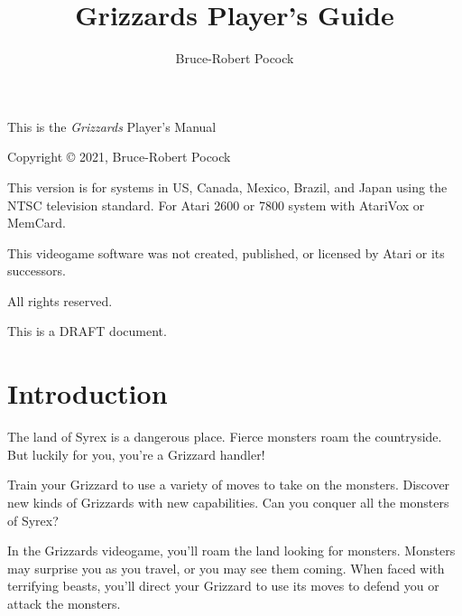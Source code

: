 \documentclass[12pt,twoside]{memoir}
\title{Grizzards Player's Guide}
\author{Bruce-Robert Pocock}
\makeatletter
\newcommand\TV{NTSC}
\newcommand\REGION{US, Canada, Mexico, Brazil, and Japan}
\newcommand\TV{PAL}
\newcommand\REGION{UK and Europe (except France)}
\newcommand\TV{SECAM}
\newcommand\REGION{France, Russia, Africa}
\def\maketitle{%
  \null
  \thispagestyle{empty}%
  \vfill
  \begin{center}\leavevmode
    \normalfont
    {\LARGE\raggedleft \@author\par}%
    \hrulefill\par
    {\huge\raggedright \@title\par}%
    \vskip 1cm
  \end{center}%
  \vfill
  \null
  \cleardoublepage
  }
\makeatother
\begin{document}


\maketitle

\frontmatter

\null\vfill

\begin{flushleft}
This is the \textit{Grizzards} Player's Manual

Copyright \copyright{} 2021, Bruce-Robert Pocock

\bigskip

This version is for systems in \REGION{} using the \TV{} television
standard. For Atari 2600 or 7800 system with AtariVox or MemCard.

\bigskip

This videogame software was not created, published, or licensed by Atari
or its successors.

\bigskip

\thedate

\bigskip

All rights reserved.

\bigskip

This is a DRAFT document.

\end{flushleft}
\let\cleardoublepage\clearpage

\mainmatter

\chapter{Introduction}\label{Introduction}

The  land of  Syrex  is  a dangerous  place.  Fierce  monsters roam  the
countryside. But luckily for you, you're a Grizzard handler!

Train your Grizzard to  use a variety of moves to  take on the monsters.
Discover new kinds  of Grizzards with new capabilities.  Can you conquer
all the monsters of Syrex?

In the Grizzards  videogame, you'll roam the land  looking for monsters.
Monsters may  surprise you as  you travel, or  you may see  them coming.
When faced  with terrifying beasts,  you'll direct your Grizzard  to use
its moves to defend you or attack the monsters.

\cleardoublepage

\tableofcontents
\end{document}
